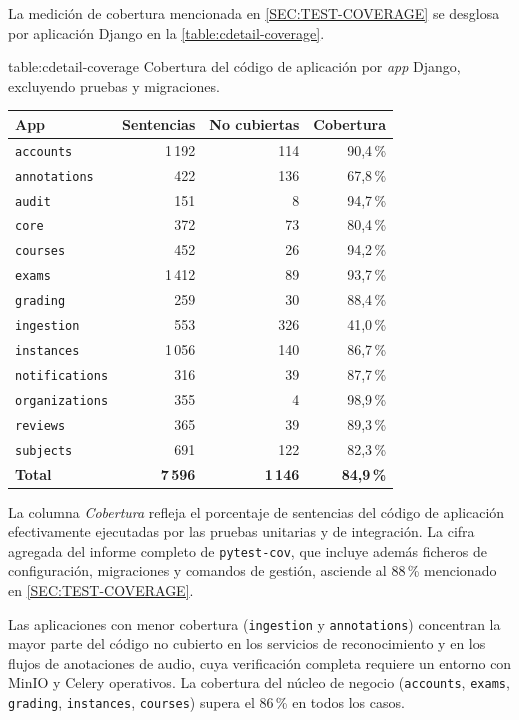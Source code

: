 La medición de cobertura mencionada en \cref{SEC:TEST-COVERAGE} se
desglosa por aplicación Django en la \cref{table:cdetail-coverage}.

\begin{table}[Cobertura del código por aplicación]%
            {table:cdetail-coverage}%
            {Cobertura del código de aplicación por \textit{app} Django,
             excluyendo pruebas y migraciones.}
  \small
  \renewcommand{\arraystretch}{1.3}
  \begin{tabular}{l r r r}
    \hline
    \textbf{App} & \textbf{Sentencias} & \textbf{No cubiertas} & \textbf{Cobertura} \\
    \hline
    \texttt{accounts}      & 1\,192 & 114  & 90{,}4\,\% \\
    \texttt{annotations}   & 422   & 136  & 67{,}8\,\% \\
    \texttt{audit}         & 151   & 8    & 94{,}7\,\% \\
    \texttt{core}          & 372   & 73   & 80{,}4\,\% \\
    \texttt{courses}       & 452   & 26   & 94{,}2\,\% \\
    \texttt{exams}         & 1\,412 & 89   & 93{,}7\,\% \\
    \texttt{grading}       & 259   & 30   & 88{,}4\,\% \\
    \texttt{ingestion}     & 553   & 326  & 41{,}0\,\% \\
    \texttt{instances}     & 1\,056 & 140  & 86{,}7\,\% \\
    \texttt{notifications} & 316   & 39   & 87{,}7\,\% \\
    \texttt{organizations} & 355   & 4    & 98{,}9\,\% \\
    \texttt{reviews}       & 365   & 39   & 89{,}3\,\% \\
    \texttt{subjects}      & 691   & 122  & 82{,}3\,\% \\
    \hline
    \textbf{Total}  & \textbf{7\,596} & \textbf{1\,146} & \textbf{84{,}9\,\%} \\
    \hline
  \end{tabular}
\end{table}

La columna \textit{Cobertura} refleja el porcentaje de sentencias del
código de aplicación efectivamente ejecutadas por las pruebas unitarias
y de integración. La cifra agregada del informe completo de
\texttt{pytest-cov}, que incluye además ficheros de configuración,
migraciones y comandos de gestión, asciende al 88\,\% mencionado en
\cref{SEC:TEST-COVERAGE}.

Las aplicaciones con menor cobertura (\texttt{ingestion} y
\texttt{annotations}) concentran la mayor parte del código no cubierto
en los servicios de reconocimiento y en los flujos de anotaciones de
audio, cuya verificación completa requiere un entorno con MinIO y
Celery operativos. La cobertura del núcleo de negocio
(\texttt{accounts}, \texttt{exams}, \texttt{grading},
\texttt{instances}, \texttt{courses}) supera el 86\,\% en todos los
casos.
